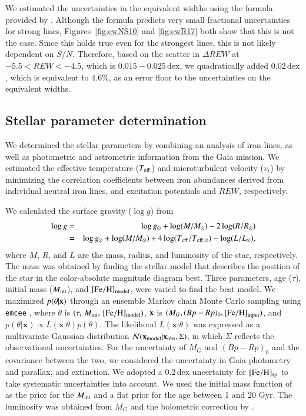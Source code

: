 \documentclass{aa}
\begin{document}
We estimated the uncertainties in the equivalent widths using the formula provided by \citet{Cayrel1988a}. 
Although the formula predicts very small fractional uncertainties for strong lines, Figures~\ref{fig:ewNS10} and \ref{fig:ewR17} both show that this is not the case.
Since this holds true even for the strongest lines, this is not likely dependent on $S/N$.
Therefore, based on the scatter in $\Delta REW$ at $-5.5<REW<-4.5$, which is $0.015-0.025\,\mathrm{dex}$, we quadratically added $0.02\,\mathrm{dex}$, which is equivalent to 4.6\%, as an error floor to the uncertainties on the equivalent widths. 

\subsection{Stellar parameter determination\label{sec:parameters}}

We determined the stellar parameters by combining an analysis of iron lines, as well as photometric and astrometric information from the Gaia mission.
We estimated the effective temperature ($T_{\rm eff}$) and microturbulent velocity ($v_t$) by minimizing the correlation coefficients between iron abundances derived from individual neutral iron lines, and excitation potentials and $REW$, respectively.

We calculated the surface gravity ($\log g$) from 
\begin{eqnarray}
\log g &=& \log g_{\odot} + \log(M/M_\odot) - 2\log(R/R_{\odot})\nonumber\\
&=&\log g_{\odot} + \log(M/M_\odot) + 4\log(T_{\rm eff}/T_{\rm eff,\odot}) - \log (L/L_\odot),\label{eq:logg}
\end{eqnarray}
where $M$, $R$, and $L$ are the mass, radius, and luminosity of the star, respectively.
The mass was obtained by finding the stellar model that describes the position of the star in the color-absolute magnitude diagram best.
Three parameters, age ($\tau$), initial mass ($M_{\rm ini}$), and $\mathrm{[Fe/H]_{\rm model}}$, were varied to find the best model.
We maximized $p(\theta|\bf x)$ through an ensemble Markov chain Monte Carlo sampling using \texttt{emcee} \citep{emcee}, where $\theta$ is $(\tau,\,M_{\rm ini},\,\mathrm{[Fe/H]_{\rm model}})$, $\bf x$ is $(M_G,(Bp-Rp)_0,\mathrm{[Fe/H]}_{\rm input})$, and $p(\theta|\textbf{x})\propto L(\textbf{x}|\theta)p(\theta)$.
The likelihood $L(\textbf{x}|\theta)$ was expressed as a multivariate Gaussian distribution $\mathcal{N}(\textbf{x}_{\rm model}|\textbf{x}_{\rm obs},\Sigma)$, in which $\Sigma$ reflects the observational uncertainties.
For the uncertainty of $M_G$ and $(Bp-Rp)_0$ and the covariance between the two, we considered the uncertainty in Gaia photometry and parallax, and extinction.
We adopted a $0.2\,\mathrm{dex}$ uncertainty for $[\mathrm{Fe/H}]_{\rm sp}$ to take systematic uncertainties into account.
We used the initial mass function of \citet{Kroupa2003a} as the prior for the $M_{\rm ini}$ and a flat prior for the age between 1 and 20 Gyr.
The luminosity was obtained from $M_G$ and the bolometric correction by \citet{Casagrande2018a}.
\end{document}
